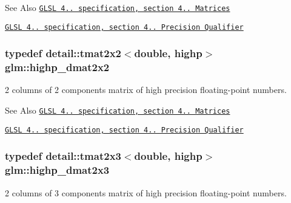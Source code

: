 \begin{DoxySeeAlso}{See Also}
\href{http://www.opengl.org/registry/doc/GLSLangSpec.4.20.8.pdf}{\tt G\-L\-S\-L 4.. specification, section 4.. Matrices} 

\href{http://www.opengl.org/registry/doc/GLSLangSpec.4.20.8.pdf}{\tt G\-L\-S\-L 4.. specification, section 4.. Precision Qualifier} 
\end{DoxySeeAlso}
\hypertarget{group__core__precision_gaa5e35f6570d394c1cd34f411a473220c}{
\subsubsection[{highp\-\_\-dmat2x2}]{\setlength{\rightskip}{0pt plus 5cm}typedef detail\-::tmat2x2$<$double, highp$>$ {\bf glm\-::highp\-\_\-dmat2x2}}}\label{group__core__precision_gaa5e35f6570d394c1cd34f411a473220c}
2 columns of 2 components matrix of high precision floating-\/point numbers.

\begin{DoxySeeAlso}{See Also}
\href{http://www.opengl.org/registry/doc/GLSLangSpec.4.20.8.pdf}{\tt G\-L\-S\-L 4.. specification, section 4.. Matrices} 

\href{http://www.opengl.org/registry/doc/GLSLangSpec.4.20.8.pdf}{\tt G\-L\-S\-L 4.. specification, section 4.. Precision Qualifier} 
\end{DoxySeeAlso}
\hypertarget{group__core__precision_gafec7367665f006f2a7643103c5eddc38}{
\subsubsection[{highp\-\_\-dmat2x3}]{\setlength{\rightskip}{0pt plus 5cm}typedef detail\-::tmat2x3$<$double, highp$>$ {\bf glm\-::highp\-\_\-dmat2x3}}}\label{group__core__precision_gafec7367665f006f2a7643103c5eddc38}
2 columns of 3 components matrix of high precision floating-\/point numbers.

